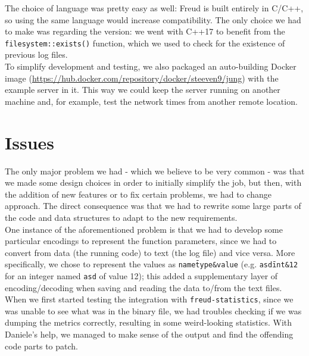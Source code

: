         The choice of language was pretty easy as well: Freud is built entirely in C/C++, so using the same
        language would increase compatibility. The only choice we had to make was regarding the version:
        we went with C++17 to benefit from the \texttt{filesystem::exists()} function, which we used to check
        for the existence of previous log files.\\

        To simplify development and testing, we also packaged an auto-building Docker image 
        (\url{https://hub.docker.com/repository/docker/steeven9/jung}) with the example server in it.
        This way we could keep the server running on another machine and, for example, test the network times
        from another remote location.


    \section{Issues}\label{sec:issues}

        The only major problem we had - which we believe to be very common - was that we made some
        design choices in order to initially simplify the job, but then, with the addition of
        new features or to fix certain problems, we had to change approach. The direct consequence was that we
        had to rewrite some large parts of the code and data structures to adapt to the new requirements.\\
        
        One instance of the aforementioned problem is that we had to develop some particular encodings
        to represent the function parameters, since we had to convert from data (the running code) to text
        (the log file) and vice versa. More specifically, we chose to represent the values as 
        \texttt{name\=type\&value} (e.g. \texttt{asd\=int\&12} for an integer named \texttt{asd} of value 12);
        this added a supplementary layer of encoding/decoding when saving and reading the data to/from the
        text files.\\

        When we first started testing the integration with \texttt{freud-statistics}, since we was unable
        to see what was in the binary file, we had troubles checking if we was dumping the metrics correctly,
        resulting in some weird-looking statistics. With Daniele's help, we managed to make sense of
        the output and find the offending code parts to patch.\\


